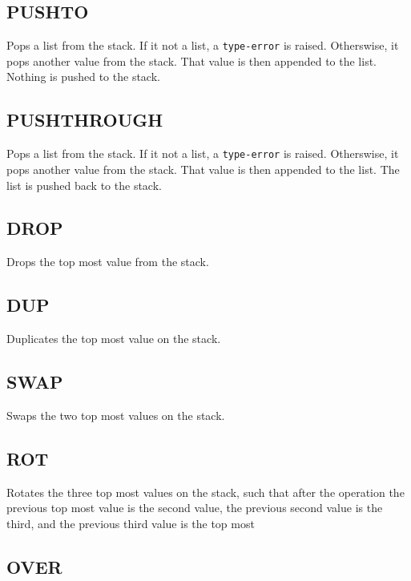 \subsection{PUSH\textunderscore{}TO}
\label{sec:pushto}

Pops a list from the stack. If it not a list, a \verb!type-error! is
raised. Otherswise, it pops another value from the stack. That value
is then appended to the list. Nothing is pushed to the stack.

\subsection{PUSH\textunderscore{}THROUGH}
\label{sec:pushthrough}

Pops a list from the stack. If it not a list, a \verb!type-error! is
raised. Otherswise, it pops another value from the stack. That value
is then appended to the list. The list is pushed back to the stack.

\subsection{DROP}
\label{sec:drop}

Drops the top most value from the stack.

\subsection{DUP}
\label{sec:dup}

Duplicates the top most value on the stack.

\subsection{SWAP}
\label{sec:swap}

Swaps the two top most values on the stack.

\subsection{ROT}
\label{sec:rot}

Rotates the three top most values on the stack, such that after the
operation the previous top most value is the second value, the previous
second value is the third, and the previous third value is the top most

\subsection{OVER}
\label{sec:over}

